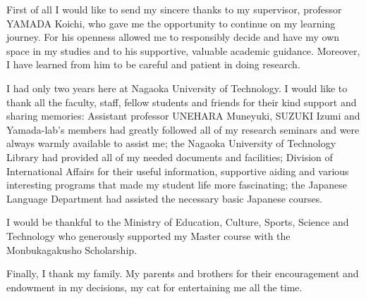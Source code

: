 First of all I would like to send my sincere thanks to my supervisor, professor YAMADA Koichi, who gave me the opportunity to continue on my learning journey. For his openness allowed me to responsibly decide and have my own space in my studies and to his supportive, valuable academic guidance. Moreover, I have learned from him to be careful and patient in doing research.

I had only two years here at Nagaoka University of Technology. I would like to thank all the faculty, staff, fellow students and friends for their kind support and sharing memories: Assistant professor UNEHARA Muneyuki, SUZUKI Izumi and Yamada-lab's members had greatly followed all of my research seminars and were always warmly available to assist me; the Nagaoka University of Technology Library had provided all of my needed documents and facilities; Division of International Affairs for their useful information, supportive aiding and various interesting programs that made my student life more fascinating; the Japanese Language Department had assisted the necessary basic Japanese courses.

I would be thankful to the Ministry of Education, Culture, Sports, Science and Technology who generously supported my Master course with the Monbukagakusho Scholarship.

Finally, I thank my family. My parents and brothers for their encouragement and endowment in my decisions, my cat for entertaining me all the time.
